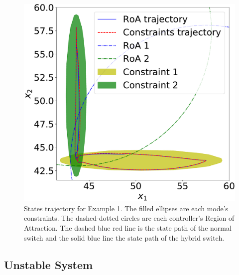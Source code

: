 \begin{figure}[ht!]
  \centering
  \includegraphics[width=0.9\linewidth]{imgs/tanks-states}
  \caption[States trajectory for Example 1.]{States trajectory for Example 1.
    The filled ellipses are each mode's constraints. The dashed-dotted circles
    are each controller's Region of Attraction. The dashed blue red line is the
    state path of the normal switch and the solid blue line the state path of
    the hybrid switch.}%
  \label{fig:states}
\end{figure}

\FloatBarrier

\subsection{Unstable System}%
\label{subsec:unstable-system}

